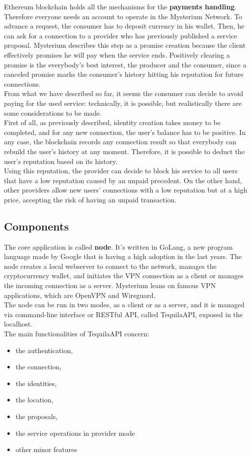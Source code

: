 \documentclass[12pt]{article}
\begin{document}
	Ethereum blockchain holds all the mechanisms for the \textbf{payments handling}. Therefore everyone needs an account to operate in the Mysterium Network. To advance a request, the consumer has to deposit currency in his wallet. Then, he can ask for a connection to a provider who has previously published a service proposal. Mysterium describes this step as a promise creation because the client effectively promises he will pay when the service ends. Positively clearing a promise is the everybody's best interest, the producer and the consumer, since a canceled promise marks the consumer's history hitting his reputation for future connections.\\
	From what we have described so far, it seems the consumer can decide to avoid paying for the used service: technically, it is possible, but realistically there are some considerations to be made.\\
	First of all, as previously described, identity creation takes money to be completed, and for any new connection, the user's balance has to be positive. In any case, the blockchain records any connection result so that everybody can rebuild the user's history at any moment. Therefore, it is possible to deduct the user's reputation based on its history.\\
	Using this reputation, the provider can decide to block his service to all users that have a low reputation caused by an unpaid precedent. On the other hand, other providers allow new users' connections with a low reputation but at a high price, accepting the risk of having an unpaid transaction.\\
	
	\subsection{Components}

	The core application is called \textbf{node}. It's written in GoLang, a new program language made by Google that is having a high adoption in the last years. The node creates a local webserver to connect to the network, manages the cryptocurrency wallet, and initiates the VPN connection as a client or manages the incoming connection as a server. Mysterium leans on famous VPN applications, which are OpenVPN and Wireguard.\\
	The node can be run in two modes, as a client or as a server, and it is managed via command-line interface or RESTful API, called TequilaAPI, exposed in the localhost.\\
	The main functionalities of TequilaAPI concern:
	\begin{itemize}
		\item the authentication,
		\item the connection,
		\item the identities,
		\item the location,
		\item the proposals,
		\item the service operations in provider mode
		\item other minor features
	\end{itemize}
\end{document}
